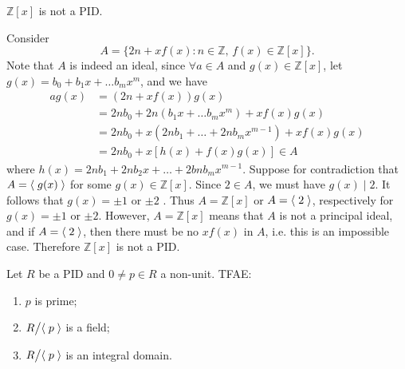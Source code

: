 \begin{eg}\label{eg:polynomials_with_integer_coefficients_is_not_a_pid}
  $\mathbb{Z}[x]$ is not a PID.

  Consider
  \begin{equation*}
    A = \{ 2n + xf(x) : n \in \mathbb{Z} , \, f(x) \in \mathbb{Z}[x] \}.
  \end{equation*}
  Note that $A$ is indeed an ideal, since $\forall a \in A$ and $g(x) \in \mathbb{Z}[x]$, let $g(x) = b_0 + b_1 x + \hdots b_m x^m$, and we have
  \begin{align*}
    ag(x) &= (2n + xf(x)) g(x) \\
          &= 2nb_0 + 2n\left( b_1x + \hdots b_mx^m \right) + x f(x) g(x) \\
          &= 2nb_0 + x( 2nb_1 + \hdots + 2nb_mx^{m - 1} ) + x f(x) g(x) \\
          &= 2nb_0 + x[ h(x) + f(x) g(x) ] \in A
  \end{align*}
  where $h(x) = 2nb_1 + 2nb_2 x + \hdots + 2bnb_m x^{m - 1}$. Suppose for contradiction that $A = \langle \; g(x) \; \rangle$  for some $g(x) \in \mathbb{Z}[x]$. Since $2 \in A$, we must have $g(x) \mid 2$. It follows that $g(x) = \pm 1$ or $\pm 2$ . Thus $A = \mathbb{Z}[x]$ or $A = \langle \; 2 \; \rangle$, respectively for $g(x) = \pm 1$ or $\pm 2$. However, $A = \mathbb{Z}[x]$ means that $A$ is not a principal ideal, and if $A = \langle \; 2 \; \rangle$, then there must be no $x f(x)$ in $A$, i.e. this is an impossible case. Therefore $\mathbb{Z}[x]$ is not a PID.
\end{eg}

\begin{thm}
\label{thm:quotient_over_a_pid}
  Let $R$ be a PID and $0 \neq p \in R$ a non-unit. TFAE:
  \begin{enumerate}
    \item $p$ is prime;
    \item $R \big/ \langle \; p \; \rangle$ is a field;
    \item $R \big/ \langle \; p \; \rangle$ is an integral domain.
  \end{enumerate}
\end{thm}

